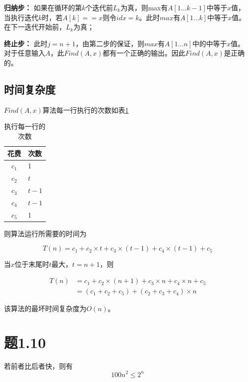 \documentclass[a4paper,twoside]{article}
\begin{document}
\begin{spacing}{1.2}
\textbf{归纳步：} 如果在循环的第$k$个迭代前$L_{k}$为真，则max有$A[1 \dots k-1]$中等于$x$值，当执行迭代$k$时，若$A[k] == x$则令$idx=k$。此时$max$有$A[1 \dots k]$中等于$x$值。在下一迭代开始前，$L_k$为真；

\textbf{终止步：} 此时$j=n+1$，由第二步的保证，则$max$有$A[1 \dots n]$中的中等于$x$值。
对于任意输入$A$，此$Find(A,x)$都有一个正确的输出。因此$Find(A,x)$是正确的。

\subsection{时间复杂度}
$Find(A,x)$算法每一行执行的次数如表\ref{tbl:p19}
\begin{table}[h]
	\renewcommand{\arraystretch}{1.2}
	\caption{执行每一行的次数}
	\label{tbl:p19}
	\begin{center}
		{\footnotesize
			\begin{tabular}{c l}
				\toprule
				{花费} & {次数} \\
				\midrule
				$c_1$ & 1 \\
				\hline
				$c_2$ & $t$ \\
				\hline
				$c_3$ & $t-1$ \\
				\hline
				$c_4$ & $t-1$ \\
				\hline
				$c_5$ & 1 \\
				\bottomrule
		\end{tabular}}
	\end{center}
\end{table}


则算法运行所需要的时间为

\begin{equation}
	T(n)=c_1 + c_2 \times t + c_3 \times (t-1) + c_4 \times (t-1) + c_5 \label{eqn:tn19}
\end{equation}

当$x$位于末尾时$t$最大，$t=n+1$，则

\begin{align*}
	T(n)&=c_1 + c_2 \times (n+1) + c_3 \times n + c_4 \times n  + c_5 \\
	&= (c_1+c_2+c_5)+(c_2+c_3+c_4) \times n
\end{align*}

该算法的最坏时间复杂度为$O(n)$。

\section{题1.10}

若前者比后者快，则有
$$
100n^2 \le 2^n
$$


\end{spacing}
\end{document}
